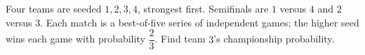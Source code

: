 Four teams are seeded $1,2,3,4$, strongest first. Semifinals are $1$ versus $4$ and $2$ versus $3$. Each match is a best-of-five series of independent games; the higher seed wins each game with probability $\dfrac{2}{3}$. Find team $3$'s championship probability.
